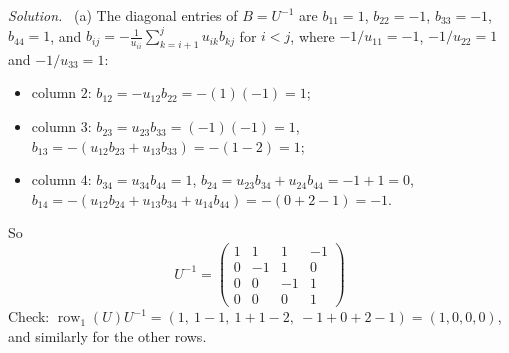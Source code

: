 \documentclass[12pt]{article}
\DeclareMathOperator{\row}{row}
\theoremstyle{definition}
\newenvironment{solution}{\par\noindent\textit{Solution.}\ }{\par\smallskip}
\begin{document}
\begin{solution}
(a) The diagonal entries of \(B=U^{-1}\) are \(b_{11}=1\), \(b_{22}=-1\), \(b_{33}=-1\), \(b_{44}=1\), and
\(b_{ij}=-\frac1{u_{ii}}\sum_{k=i+1}^ju_{ik}b_{kj}\) for \(i<j\), where \(-1/u_{11}=-1\), \(-1/u_{22}=1\) and
\(-1/u_{33}=1\):
\begin{itemize}
\item column \(2\): \(b_{12}=-u_{12}b_{22}=-(1)(-1)=1\);
\item column \(3\): \(b_{23}=u_{23}b_{33}=(-1)(-1)=1\), \(b_{13}=-(u_{12}b_{23}+u_{13}b_{33})=-(1-2)=1\);
\item column \(4\): \(b_{34}=u_{34}b_{44}=1\), \(b_{24}=u_{23}b_{34}+u_{24}b_{44}=-1+1=0\),
\(b_{14}=-(u_{12}b_{24}+u_{13}b_{34}+u_{14}b_{44})=-(0+2-1)=-1\).
\end{itemize}
So
\[
U^{-1}=\begin{pmatrix}1&1&1&-1\\0&-1&1&0\\0&0&-1&1\\0&0&0&1\end{pmatrix}
\]
Check: \(\row_1(U)U^{-1}=(1,\ 1-1,\ 1+1-2,\ -1+0+2-1)=(1,0,0,0)\), and similarly for the other rows.


\end{solution}
\end{document}
